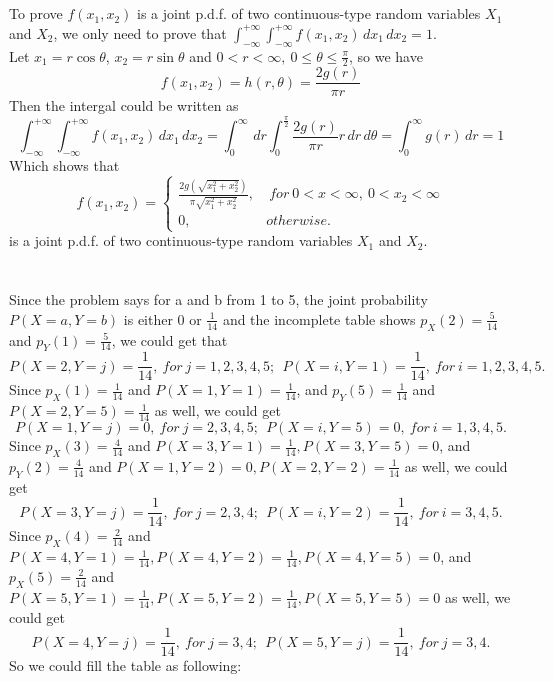 \documentclass[10.5pt]{article}
\begin{document}
\section{}
To prove $f(x_1,x_2)$ is a joint p.d.f. of two continuous-type random variables $X_1$ and $X_2$, we only need to prove that $\int_{-\infty}^{+\infty} \int_{-\infty}^{+\infty} f(x_1,x_2) \,dx_1 \,dx_2 = 1$. \\\indent
Let $x_1 = r\cos\theta$, $x_2 = r\sin\theta$ and $0<r<\infty, ~0\leqslant\theta\leqslant \frac{\pi}{2} $, so we have $$f(x_1,x_2) = h(r,\theta) = \frac{2g(r)}{\pi r} $$
Then the intergal could be written as $$\int_{-\infty}^{+\infty} \int_{-\infty}^{+\infty} f(x_1,x_2) \,dx_1 \,dx_2 = \int_0^{\infty} \,dr \int_0^{\frac{\pi}{2}} \frac{2g(r)}{\pi r} r \,dr \,d\theta = \int_0^{\infty} g(r) \,dr = 1$$\indent
Which shows that $$f(x_1,x_2) = \begin{cases}
    \frac{2g(\sqrt{x_1^2+x_2^2})}{\pi\sqrt{x_1^2+x_2^2}}, & ~for ~0<x<\infty,~0<x_2<\infty\\
    0, & otherwise.
\end{cases}$$ is a joint p.d.f. of two continuous-type random variables $X_1$ and $X_2$.

\section{}
Since the problem says for a and b from 1 to 5, the joint probability $P(X=a,Y=b)$ is either 0 or $\frac{1}{14}$ and the incomplete table shows $p_X(2) = \frac{5}{14}$ and $p_Y(1) = \frac{5}{14}$, we could get that $$P(X=2,Y=j) = \frac{1}{14}, ~for ~j=1,2,3,4,5; ~~P(X=i,Y=1) = \frac{1}{14}, ~for ~i=1,2,3,4,5.$$\indent
Since $p_X(1) = \frac{1}{14}$ and $P(X=1,Y=1) = \frac{1}{14}$, and $p_Y(5) = \frac{1}{14}$ and $P(X=2,Y=5) = \frac{1}{14}$ as well, we could get $$P(X=1,Y=j) = 0, ~for ~j=2,3,4,5; ~~P(X=i,Y=5) = 0, ~for ~i=1,3,4,5.$$\indent
Since $p_X(3) = \frac{4}{14}$ and $P(X=3,Y=1) = \frac{1}{14},P(X=3,Y=5) = 0$, and $p_Y(2) = \frac{4}{14}$ and $P(X=1,Y=2) = 0,P(X=2,Y=2) = \frac{1}{14}$ as well, we could get $$P(X=3,Y=j) = \frac{1}{14}, ~for ~j=2,3,4; ~~P(X=i,Y=2) = \frac{1}{14}, ~for ~i=3,4,5.$$\indent
Since $p_X(4) = \frac{2}{14}$ and $P(X=4,Y=1) = \frac{1}{14},P(X=4,Y=2) = \frac{1}{14},P(X=4,Y=5) = 0$, and $p_X(5) = \frac{2}{14}$ and $P(X=5,Y=1) = \frac{1}{14},P(X=5,Y=2) = \frac{1}{14},P(X=5,Y=5) = 0$ as well, we could get $$P(X=4,Y=j) = \frac{1}{14}, ~for ~j=3,4; ~~P(X=5,Y=j) = \frac{1}{14}, ~for ~j=3,4.$$\indent
So we could fill the table as following:
\end{document}
